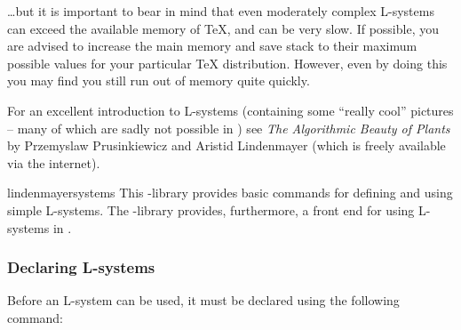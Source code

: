 \noindent
\ldots but it is important to bear in mind that even moderately
complex L-systems can exceed the available memory of \TeX, 
and can be very slow. 
If possible, you are advised to increase the main memory and save 
stack to their maximum possible values for your particular 
\TeX{} distribution. 
However, even by doing this you may find you still run out of memory
quite quickly.

For an excellent introduction to L-systems (containing some
``really cool'' pictures -- many of which are sadly not possible in 
\pgfname)
see \emph{The Algorithmic Beauty of Plants} by 
Przemyslaw Prusinkiewicz and Aristid Lindenmayer (which is freely
available via the internet). 

\begin{pgflibrary}{lindenmayersystems}
  This \pgfname-library provides basic commands for defining and using 
  simple L-systems. The \tikzname-library provides, furthermore, a
  front end for using L-systems in  \tikzname. 
\end{pgflibrary}



\subsubsection{Declaring L-systems}
  Before an L-system can be used, it must be declared using the
  following command:
  
